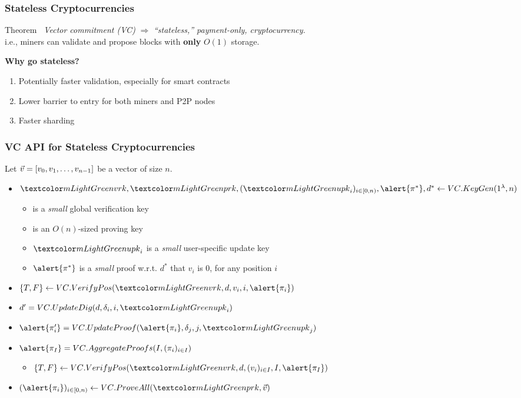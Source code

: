 \begin{frame}
    \frametitle{Stateless Cryptocurrencies}

     \begin{exampleblock}{Theorem~\cite{CPZ18}}
     \textit{Vector commitment (VC)} $\Rightarrow$ \textit{``stateless,'' payment-only, cryptocurrency}.\\
     \pause
     i.e., miners can validate and propose blocks with \textbf{only} $O(1)$ storage.
     \end{exampleblock}
     \pause
     \alert{\textbf{Why go stateless?}}\pause
     \begin{enumerate}
         \item Potentially faster validation, especially for smart contracts\pause
         \item Lower barrier to entry for both miners and P2P nodes\pause
         \item Faster sharding
     \end{enumerate}
\end{frame}

\begin{frame}
    \frametitle{VC API for Stateless Cryptocurrencies}

    Let $\vec{{v}}=[v_0, v_1, \dots, v_{n-1}]$ be a vector of size $n$.\pause

    \begin{itemize}
        \item $\vrk,\prk,(\upk_i)_{i\in[0,n)},\alert{\pi^*}, d^* \leftarrow \vcsetup(1^\lambda, n)$\pause
        \begin{itemize}
            \item \vrk is a \textit{small} global \alert{verification key}\pause
            \item \prk is an $O(n)$-sized \alert{proving key}\pause
            \item $\upk_i$ is a \textit{small} user-specific \alert{update key}\pause
            \item $\alert{\pi^*}$ is a \textit{small} proof w.r.t. $d^*$ that $v_i$ is 0, for any position $i$\pause
        \end{itemize}
        \item $\{T,F\}\leftarrow \vcverifypos(\vrk, d, v_i, i, \alert{\pi_i})$\pause
        \item $d'=\vccommupdate(d, \delta_i, i, \upk_i)$\pause
        \item $\alert{\pi_i'} = \vcproofupdate(\alert{\pi_i}, \delta_j, j, \upk_j)$\pause
        \item $\alert{\pi_I} = \vcaggregateproofs(I, (\pi_i)_{i\in I})$\pause
        \begin{itemize}
            \item $\{T,F\}\leftarrow \vcverifypos(\vrk, d, (v_i)_{i\in I}, I, \alert{\pi_I})$\pause
        \end{itemize}
        \item $(\alert{\pi_i})_{i\in[0,n)} \leftarrow \vcopenall(\prk, \vect{v})$\pause
    \end{itemize}
\end{frame}